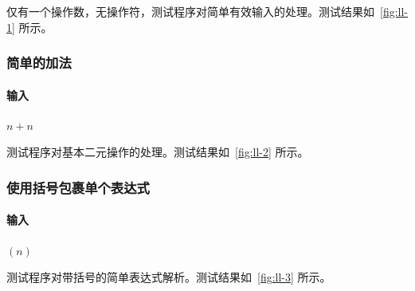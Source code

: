 仅有一个操作数，无操作符，测试程序对简单有效输入的处理。测试结果如~\autoref{fig:ll-1} 所示。

\subsubsection{简单的加法}
\paragraph{输入} $n+n$

测试程序对基本二元操作的处理。测试结果如~\autoref{fig:ll-2} 所示。

\subsubsection{使用括号包裹单个表达式}
\paragraph{输入} $(n)$

测试程序对带括号的简单表达式解析。测试结果如~\autoref{fig:ll-3} 所示。

